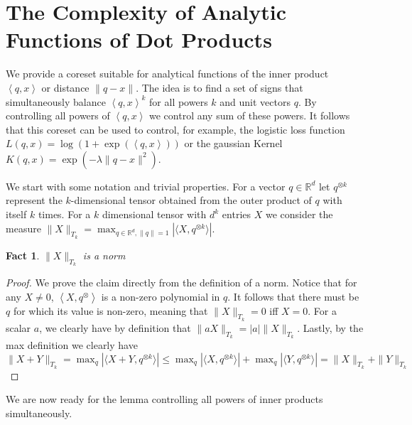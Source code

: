 \documentclass[anon,12pt]{colt2019} %
\newtheorem{fact}[theorem]{Fact}
\newcommand{\ip}[1]{\left \langle #1 \right \rangle}
\newcommand{\R}{\mathbb{R}}
\begin{document}
\section{The Complexity of Analytic Functions of Dot Products}

We provide a coreset suitable for analytical functions of the inner product $\ip{q,x}$ or distance $\|q-x\|$. The idea is to find a set of signs that simultaneously balance $\ip{q,x}^k$ for all powers $k$ and unit vectors $q$. By controlling all powers of $\ip{q,x}$ we control any sum of these powers. It follows that this coreset can be used to control, for example, the logistic loss function $L(q,x) = \log(1+\exp(\ip{q,x}))$ or the gaussian Kernel $K(q,x) = \exp(-\lambda \|q-x\|^2)$. 


We start with some notation and trivial properties. 
For a vector $q \in \R^d$ let $q^{\otimes k}$ represent the $k$-dimensional tensor obtained from the outer product of $q$ with itself $k$ times. For a $k$ dimensional tensor with $d^k$ entries $X$ we consider the measure
$\|X\|_{T_k} = \max_{q \in \R^d, \|q\|=1} \left| \langle X, q^{\otimes k}\rangle \right|$.
\begin{fact}
$\|X\|_{T_k}$ is a norm
\end{fact}
\begin{proof}
We prove the claim directly from the definition of a norm.
Notice that for any $X \neq 0$, $\ip{X, q^{\otimes}}$ is a non-zero polynomial in $q$. It follows that there must be $q$ for which its value is non-zero, meaning that $\|X\|_{T_k}=0$ iff $X=0$. For a scalar $a$, we clearly have by definition that
$\|aX\|_{T_k} = |a|\|X\|_{T_k}$.  Lastly, by the max definition we clearly have
$ \|X+Y\|_{T_k} =  \max_q \left| \langle X+Y, q^{\otimes k}\rangle \right| \leq 
\max_q \left| \langle X, q^{\otimes k}\rangle \right| + \max_q\left| \langle Y, q^{\otimes k}\rangle \right| = \|X\|_{T_k} + \|Y\|_{T_k}$
\end{proof}

We are now ready for the lemma controlling all powers of inner products simultaneously. 
\end{document}
